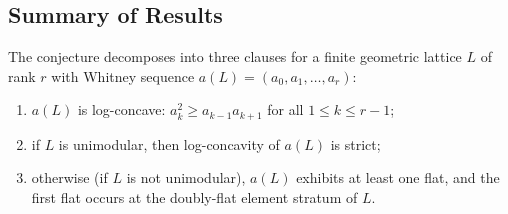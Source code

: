 \documentclass[11pt]{article}
\theoremstyle{definition}
\theoremstyle{remark}
\begin{document}
\subsection{Summary of Results}
The conjecture decomposes into three clauses for a finite geometric lattice $L$ of rank $r$ with
Whitney sequence $a(L) = (a_0, a_1, \dots, a_r)$:
\begin{enumerate}
  \item[(I)] $a(L)$ is log-concave: $a_k^2 \ge a_{k-1} a_{k+1}$ for all $1 \le k \le r - 1$;
  \item[(II)] if $L$ is unimodular, then log-concavity of $a(L)$ is strict;
  \item[(III)] otherwise (if $L$ is not unimodular), $a(L)$ exhibits at least one flat, and the first
    flat occurs at the doubly-flat element stratum of $L$.
\end{enumerate}
\end{document}
